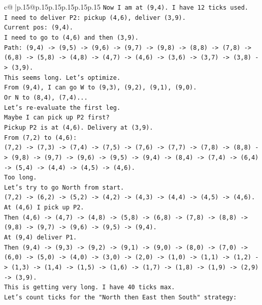 \documentclass{article}
\begin{document}
{\begin{supertabular}{c@{$\;$}|p{.15\linewidth}@{}p{.15\linewidth}p{.15\linewidth}p{.15\linewidth}p{.15\linewidth}p{.15\linewidth}}
{{{\texttt{Now I am at (9,4). I have 12 ticks used.} \\
\texttt{I need to deliver P2: pickup (4,6), deliver (3,9).} \\
\texttt{Current pos: (9,4).} \\
\texttt{I need to go to (4,6) and then (3,9).} \\
\texttt{Path: (9,4) {-}> (9,5) {-}> (9,6) {-}> (9,7) {-}> (9,8) {-}> (8,8) {-}> (7,8) {-}> (6,8) {-}> (5,8) {-}> (4,8) {-}> (4,7) {-}> (4,6) {-}> (3,6) {-}> (3,7) {-}> (3,8) {-}> (3,9).} \\
\texttt{This seems long. Let's optimize.} \\
\texttt{From (9,4), I can go W to (9,3), (9,2), (9,1), (9,0).} \\
\texttt{Or N to (8,4), (7,4)...} \\
\texttt{Let's re{-}evaluate the first leg.} \\
\texttt{Maybe I can pick up P2 first?} \\
\texttt{Pickup P2 is at (4,6). Delivery at (3,9).} \\
\texttt{From (7,2) to (4,6):} \\
\texttt{(7,2) {-}> (7,3) {-}> (7,4) {-}> (7,5) {-}> (7,6) {-}> (7,7) {-}> (7,8) {-}> (8,8) {-}> (9,8) {-}> (9,7) {-}> (9,6) {-}> (9,5) {-}> (9,4) {-}> (8,4) {-}> (7,4) {-}> (6,4) {-}> (5,4) {-}> (4,4) {-}> (4,5) {-}> (4,6).} \\
\texttt{Too long.} \\
\texttt{Let's try to go North from start.} \\
\texttt{(7,2) {-}> (6,2) {-}> (5,2) {-}> (4,2) {-}> (4,3) {-}> (4,4) {-}> (4,5) {-}> (4,6).} \\
\texttt{At (4,6) I pick up P2.} \\
\texttt{Then (4,6) {-}> (4,7) {-}> (4,8) {-}> (5,8) {-}> (6,8) {-}> (7,8) {-}> (8,8) {-}> (9,8) {-}> (9,7) {-}> (9,6) {-}> (9,5) {-}> (9,4).} \\
\texttt{At (9,4) deliver P1.} \\
\texttt{Then (9,4) {-}> (9,3) {-}> (9,2) {-}> (9,1) {-}> (9,0) {-}> (8,0) {-}> (7,0) {-}> (6,0) {-}> (5,0) {-}> (4,0) {-}> (3,0) {-}> (2,0) {-}> (1,0) {-}> (1,1) {-}> (1,2) {-}> (1,3) {-}> (1,4) {-}> (1,5) {-}> (1,6) {-}> (1,7) {-}> (1,8) {-}> (1,9) {-}> (2,9) {-}> (3,9).} \\
\texttt{This is getting very long. I have 40 ticks max.} \\
\texttt{Let's count ticks for the "North then East then South" strategy:} \\
}}}
\end{supertabular}}
\end{document}
